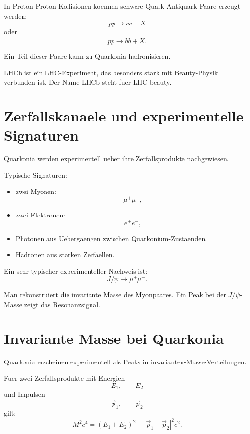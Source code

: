 \begin{examplebox}
In Proton-Proton-Kollisionen koennen schwere Quark-Antiquark-Paare erzeugt werden:
\[
    pp \rightarrow c\overline{c}+X
\]
oder
\[
    pp \rightarrow b\overline{b}+X.
\]

Ein Teil dieser Paare kann zu Quarkonia hadronisieren.
\end{examplebox}

\begin{notebox}
LHCb ist ein LHC-Experiment, das besonders stark mit Beauty-Physik verbunden ist.
Der Name LHCb steht fuer LHC beauty.
\end{notebox}

\section{Zerfallskanaele und experimentelle Signaturen}

Quarkonia werden experimentell ueber ihre Zerfallsprodukte nachgewiesen.

\begin{conceptbox}
Typische Signaturen:
\begin{itemize}
    \item zwei Myonen:
    \[
        \mu^+\mu^-,
    \]
    \item zwei Elektronen:
    \[
        e^+e^-,
    \]
    \item Photonen aus Uebergaengen zwischen Quarkonium-Zustaenden,
    \item Hadronen aus starken Zerfaellen.
\end{itemize}
\end{conceptbox}

\begin{examtipbox}
Ein sehr typischer experimenteller Nachweis ist:
\[
    J/\psi \rightarrow \mu^+\mu^-.
\]

Man rekonstruiert die invariante Masse des Myonpaares.
Ein Peak bei der $J/\psi$-Masse zeigt das Resonanzsignal.
\end{examtipbox}

\section{Invariante Masse bei Quarkonia}

Quarkonia erscheinen experimentell als Peaks in invarianten-Masse-Verteilungen.

\begin{formulabox}
Fuer zwei Zerfallsprodukte mit Energien
\[
    E_1,\qquad E_2
\]
und Impulsen
\[
    \vec p_1,\qquad \vec p_2
\]
gilt:
\[
    M^2c^4
    =
    (E_1+E_2)^2
    -
    \left|\vec p_1+\vec p_2\right|^2c^2.
\]
\end{formulabox}

